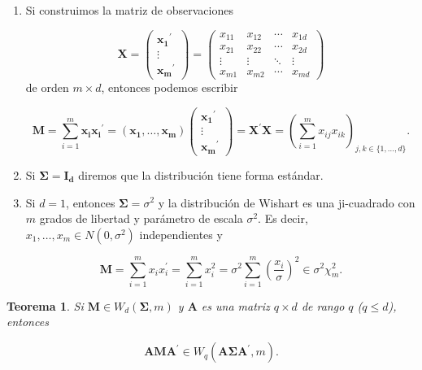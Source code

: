 \documentclass[
  a4paper,
  oneside]{scrbook}
\newtheorem{theorem}{Teorema}[chapter]
\theoremstyle{definition}
\theoremstyle{definition}
\theoremstyle{definition}
\theoremstyle{definition}
\theoremstyle{remark}
\begin{document}
\begin{enumerate}
\def\labelenumi{\arabic{enumi}.}
\item
  Si construimos la matriz de observaciones

  \[\bm{X}=\left(\begin{array}{c} \bm{x_1}^{\prime} \\ \vdots \\ \bm{x_m}^{\prime} \end{array}\right)
  =\left(\begin{array}{cccc} x_{11} & x_{12} & \cdots & x_{1d}\\
  x_{21} & x_{22} & \cdots & x_{2d}\\
  \vdots & \vdots & \ddots & \vdots \\
  x_{m1} & x_{m2} & \cdots & x_{md}\end{array}\right)\] de orden
  \(m\times d\), entonces podemos escribir

  \[\bm{M}=\sum_{i=1}^m \bm{x_i} \bm{x_i}^{\prime}=\left(\bm{x_1},\ldots,\bm{x_m}\right)
  \left(\begin{array}{c} \bm{x_1}^{\prime} \\ \vdots \\ \bm{x_m}^{\prime} \end{array}\right)
  =\bm{X}^{\prime}\bm{X}=\left(\sum_{i=1}^m x_{ij} x_{ik}\right)_{j,k\in\{1,\ldots,d\}}.\]
\item
  Si \(\bm\Sigma=\bm{I_d}\) diremos que la distribución tiene forma
  estándar.
\item
  Si \(d=1\), entonces \(\bm\Sigma=\sigma^2\) y la distribución de Wishart
  es una ji-cuadrado con \(m\) grados de libertad y parámetro de escala
  \(\sigma^2\). Es decir, \(x_1,\ldots,x_m\in N(0,\sigma^2)\)
  independientes y

  \[\bm{M}=\sum_{i=1}^m x_i x_i^{\prime}=\sum_{i=1}^m x_i^2
  =\sigma^2 \sum_{i=1}^m \left(\frac{x_i}{\sigma}\right)^2 \in \sigma^2 \chi_m^2.\]
\end{enumerate}

\begin{theorem}
\protect\hypertarget{thm:transW}{}\label{thm:transW}Si \(\bm{M}\in W_d(\bm\Sigma,m)\) y
\(\bm{A}\) es una matriz \(q\times d\) de rango \(q\) (\(q\leq d\)), entonces

\[\bm{A}\bm{M}\bm{A}^{\prime}\in W_q\left(\bm{A}\bm\Sigma \bm{A}^{\prime},m\right).\]
\end{theorem}
\end{document}
